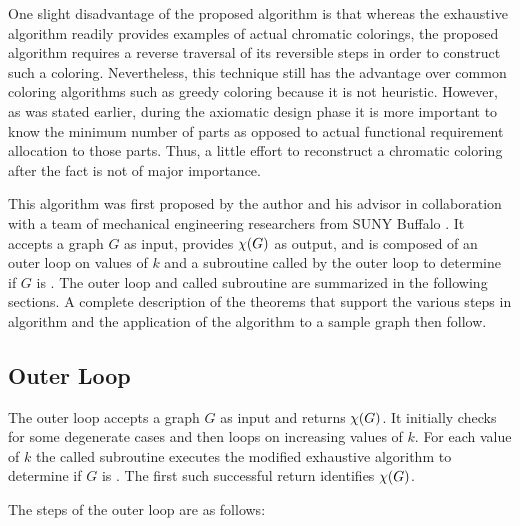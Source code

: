 One slight disadvantage of the proposed algorithm is that whereas the exhaustive algorithm readily provides
examples of actual chromatic colorings, the proposed algorithm requires a reverse traversal of its reversible steps
in order to construct such a coloring.  Nevertheless, this technique still has the advantage over common coloring
algorithms such as greedy coloring because it is not heuristic.  However, as was stated earlier, during the
axiomatic design phase it is more important to know the minimum number of parts as opposed to actual functional
requirement allocation to those parts.  Thus, a little effort to reconstruct a chromatic coloring after the fact is
not of major importance.

This algorithm was first proposed by the author and his advisor in collaboration with a team of mechanical
engineering researchers from SUNY Buffalo \cite{cavallaro}.  It accepts a graph \(G\) as input, provides \(\chi(G)\)
as output, and is composed of an outer loop on values of \(k\) and a subroutine called by the outer loop to
determine if \(G\) is .  The outer loop and called subroutine are summarized in the following
sections.  A complete description of the theorems that support the various steps in algorithm and the application
of the algorithm to a sample graph then follow.

\subsection{Outer Loop}

The outer loop accepts a graph \(G\) as input and returns \(\chi(G)\).  It initially checks for some degenerate cases
and then loops on increasing values of \(k\).  For each value of \(k\) the called subroutine executes the modified
exhaustive algorithm to determine if \(G\) is .  The first such successful return identifies
\(\chi(G)\).

The steps of the outer loop are as follows:

